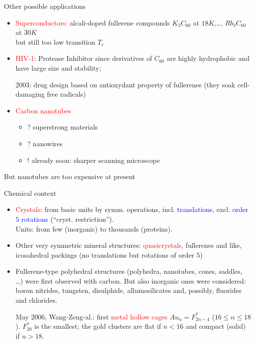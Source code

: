 \documentclass[%
pdf,
colorBG,
slideColor,
]{prosper}
\begin{document}
\begin{slide}{Other possible applications}
\begin{itemize}
\item \textcolor{red}{Superconductors:} alcali-doped fullerene compounds
$K_3C_{60}$ at $18K$,\dots, $Rb_3C_{60}$ at $30K$\\
but still too low transition $T_c$
\item \textcolor{red}{HIV-1}: Protease Inhibitor since
derivatives of $C_{60}$ are highly hydrophobic and have large 
size and stability;
\par 2003: drug design based on antioxydant property of 
fullerenes (they soak cell-damaging free radicals)
\item \textcolor{red}{Carbon nanotubes}
\begin{itemize}
\item ? superstrong materials
\item ? nanowires
\item ! already soon: sharper scanning microscope
\end{itemize}
\end{itemize}
But nanotubes are too expensive at present
\end{slide}




\begin{slide}{Chemical context}
\begin{itemize}
\item \textcolor{red}{Crystals}: from basic units by symm. operations, incl. 
\textcolor{blue}{translations}, excl. \textcolor{blue}{order $5$ 
rotations} (``cryst. 
restriction'').\\
Units: from few (inorganic) to thousands (proteins).
\item Other very symmetric mineral structures: \textcolor{red}{quasicrystals}, 
fullerenes and like, icosahedral packings (no translations but rotations 
of order $5$)
\item Fullerene-type polyhedral structures (polyhedra, nanotubes, cones, saddles, \dots) were first observed with carbon.
But also inorganic ones were considered: boron nitrides, tungsten, 
disulphide,
allumosilicates and, possibly, fluorides and chlorides.

May 2006, Wang-Zeng-al.: first \textcolor{red}{metal hollow cages}
$Au_n=F^{*}_{2n-4}$ ($16 \le n \le18$). $F^{*}_{28}$ is the smallest; 
the gold 
clusters are 
flat if $n<16$ and compact (solid) if $n>18$.


\end{itemize}

\end{slide}
\end{document}
